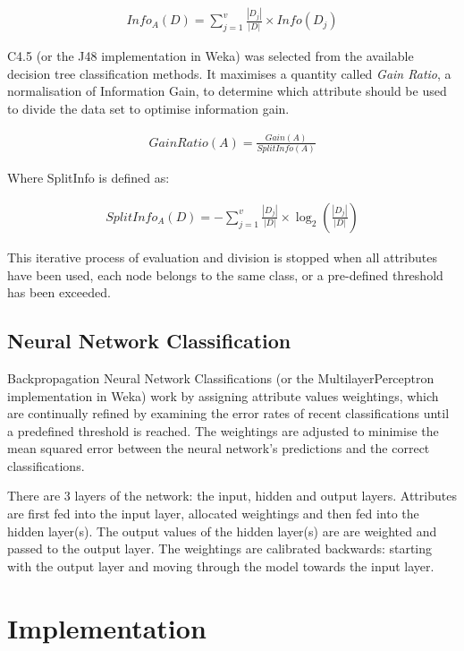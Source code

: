 \documentclass[11pt, a4paper]{article}
\begin{document}
\begin{align*}
	Info_A(D) = \sum^{v}_{j=1}\frac{|D_j|}{|D|} \times Info(D_j)
\end{align*}


C4.5 (or the J48 implementation in Weka) was selected from the available decision tree classification methods. It maximises a quantity called \textit{Gain Ratio}, a normalisation of Information Gain, to determine which attribute should be used to divide the data set to optimise information gain.

\begin{align*}
	Gain Ratio(A) = \frac{Gain(A)}{SplitInfo(A)}
\end{align*}

Where SplitInfo is defined as:

\begin{align*}
	SplitInfo_A(D) = - \sum^{v}_{j=1}\frac{|D_j|}{|D|} \times \log_2(\frac{|D_j|}{|D|})
\end{align*}

This iterative process of evaluation and division is stopped when all attributes have been used, each node belongs to the same class, or a pre-defined threshold has been exceeded.

\subsection*{Neural Network Classification}

Backpropagation Neural Network Classifications (or the MultilayerPerceptron implementation in Weka) work by assigning attribute values weightings, which are continually refined by examining the error rates of recent classifications until a predefined threshold is reached. The weightings are adjusted to minimise the mean squared error between the neural network's predictions and the correct classifications.

There are 3 layers of the network: the input, hidden and output layers. Attributes are first fed into the input layer, allocated weightings and then fed into the hidden layer(s). The output values of the hidden layer(s) are are weighted and passed to the output layer. The weightings are calibrated backwards: starting with the output layer and moving through the model towards the input layer.

\section*{Implementation}
\end{document}
